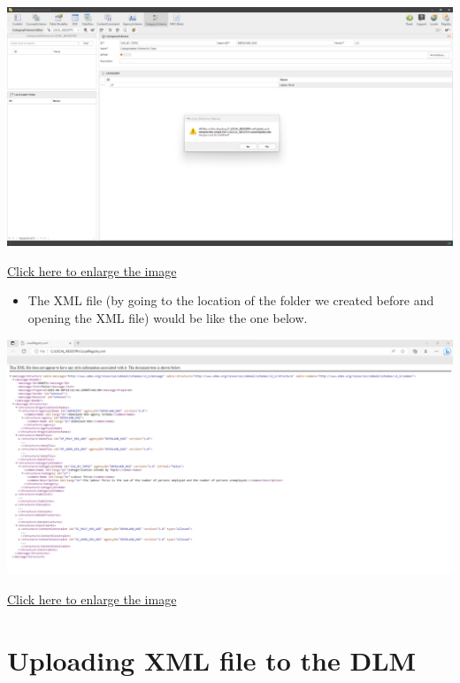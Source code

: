 \documentclass[
]{book}
\providecommand{\tightlist}{%
  \setlength{\itemsep}{0pt}\setlength{\parskip}{0pt}}
\begin{document}
\begin{center}\includegraphics[width=1\linewidth]{./images/image180} \end{center}

\href{images/image180.png}{Click here to enlarge the image}

\begin{itemize}
\tightlist
\item
  The XML file (by going to the location of the folder we created before and opening the XML file) would be like the one below.
\end{itemize}

\begin{center}\includegraphics[width=1\linewidth]{./images/image182} \end{center}

\href{images/image182.png}{Click here to enlarge the image}

\hypertarget{uploading-xml}{%
\section{Uploading XML file to the DLM}\label{uploading-xml}}
\end{document}
